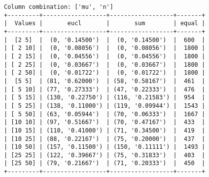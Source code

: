 \documentclass{article}
\begin{document}
\begin{verbatim}
Column combination: ['mu', 'n']
+---------+------------------+------------------+-------+
|  Values |       eucl       |       sum        | equal |
+---------+------------------+------------------+-------+
|  [2 5]  |  (0, '0.14500')  |  (0, '0.14500')  |  600  |
| [ 2 10] |  (0, '0.08056')  |  (0, '0.08056')  |  1800 |
| [ 2 15] |  (0, '0.04556')  |  (0, '0.04556')  |  1800 |
| [ 2 25] |  (0, '0.03667')  |  (0, '0.03667')  |  1800 |
| [ 2 50] |  (0, '0.01722')  |  (0, '0.01722')  |  1800 |
|  [5 5]  | (81, '0.62000')  | (58, '0.58167')  |  461  |
| [ 5 10] | (77, '0.27333')  | (47, '0.22333')  |  476  |
| [ 5 15] | (130, '0.22750') | (116, '0.21583') |  954  |
| [ 5 25] | (138, '0.11000') | (119, '0.09944') |  1543 |
| [ 5 50] | (63, '0.05944')  | (70, '0.06333')  |  1667 |
| [10 10] | (97, '0.51667')  | (70, '0.47167')  |  433  |
| [10 15] | (110, '0.41000') | (71, '0.34500')  |  419  |
| [10 25] | (88, '0.22167')  | (75, '0.20000')  |  437  |
| [10 50] | (157, '0.11500') | (150, '0.11111') |  1493 |
| [25 25] | (122, '0.39667') | (75, '0.31833')  |  403  |
| [25 50] | (79, '0.21667')  | (71, '0.20333')  |  450  |
+---------+------------------+------------------+-------+
\end{verbatim}
\end{document}
